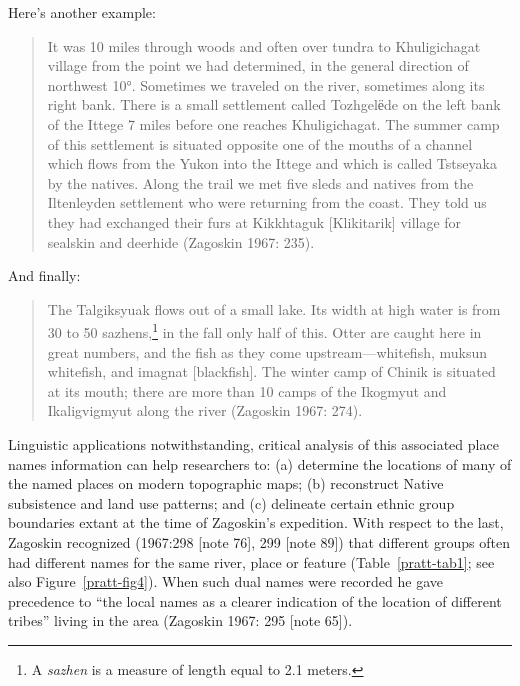 \noindent
Here’s another example:

\begin{quote}
    It was 10 miles through woods and often over tundra to Khuligichagat village from the point we had determined, in the general direction of northwest 10°. Sometimes we traveled on the river, sometimes along its right bank. There is a small settlement called Tozhgelёde on the left bank of the Ittege 7 miles before one reaches Khuligichagat. The summer camp of this settlement is situated opposite one of the mouths of a channel which flows from the Yukon into the Ittege and which is called Tstseyaka by the natives. Along the trail we met five sleds and natives from the Iltenleyden settlement who were returning from the coast. They told us they had exchanged their furs at Kikkhtaguk [Klikitarik] village for sealskin and deerhide (Zagoskin 1967: 235).
\end{quote}

\noindent
And finally:

\begin{quote}
    The Talgiksyuak flows out of a small lake. Its width at high water is from 30 to 50 sazhens,\footnote{A \textit{sazhen} is a measure of length equal to 2.1 meters. } in the fall only half of this. Otter are caught here in great numbers, and the fish as they come upstream—whitefish, muksun whitefish, and imagnat [blackfish]. The winter camp of Chinik is situated at its mouth; there are more than 10 camps of the Ikogmyut and Ikaligvigmyut along the river (Zagoskin 1967: 274).
\end{quote}

Linguistic applications notwithstanding, critical analysis of this associated place names information can help researchers to: (a) determine the locations of many of the named places on modern topographic maps; (b) reconstruct Native subsistence and land use patterns; and (c) delineate certain ethnic group boundaries extant at the time of Zagoskin’s expedition. With respect to the last, Zagoskin recognized (1967:298 [note 76], 299 [note 89]) that different groups often had different names for the same river, place or feature (Table~\ref{pratt-tab1}; see also Figure~\ref{pratt-fig4}). When such dual names were recorded he gave precedence to “the local names as a clearer indication of the location of different tribes” living in the area (Zagoskin 1967: 295 [note 65]).


